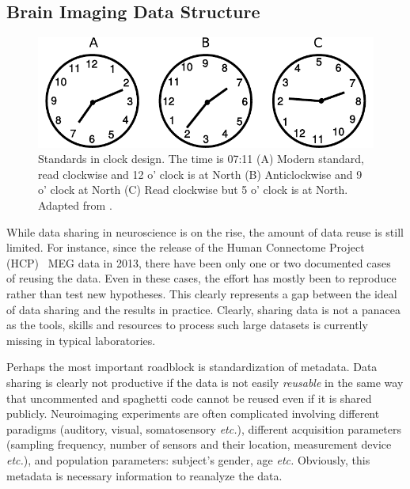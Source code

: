 \subsection{Brain Imaging Data Structure}

\begin{figure}[htb]
\begin{center}
   \includegraphics[width=0.8\linewidth]{figures/clock.pdf}
\end{center}
   \caption[Standards in clocks]{Standards in clock design. The time is 07:11 (A) Modern standard, read clockwise and 12 o' clock is at North (B) Anticlockwise and 9 o' clock at North (C) Read clockwise but 5 o' clock is at North. Adapted from \cite{norman2013design}.}
   \label{fig:clock_standards}
\end{figure}

While data sharing in neuroscience is on the rise, the amount of data reuse is still limited. For instance, since the release of the Human Connectome Project (HCP)~\citep{larson2013adding} MEG data in 2013, there have been only one or two documented cases~\citep{jas2017autoreject} of reusing the data. Even in these cases, the effort has mostly been to reproduce rather than test new hypotheses. This clearly represents a gap between the ideal of data sharing and the results in practice. Clearly, sharing data is not a panacea as the tools, skills and resources to process such large datasets is currently missing in typical laboratories. 

Perhaps the most important roadblock is standardization of metadata. Data sharing is clearly not productive if the data is not easily  \emph{reusable} in the same way that uncommented and spaghetti code cannot be reused even if it is shared publicly. Neuroimaging experiments are often complicated involving different paradigms (auditory, visual, somatosensory \emph{etc.}), different acquisition parameters (sampling frequency, number of sensors and their location, measurement device \emph{etc.}), and population parameters: subject's gender, age \emph{etc.} Obviously, this metadata is necessary information to reanalyze the data.   

